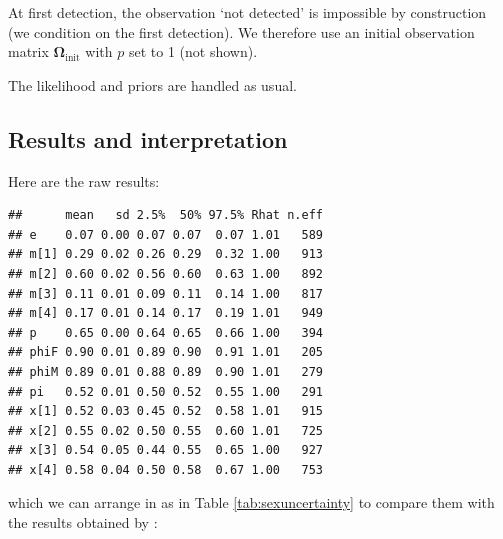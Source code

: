 \documentclass[
  12pt,
]{krantz}
\begin{document}
At first detection, the observation `not detected' is impossible by construction (we condition on the first detection). We therefore use an initial observation matrix \(\mathbf{\Omega}_{\text{init}}\) with \(p\) set to 1 (not shown).

The likelihood and priors are handled as usual.

\subsection{Results and interpretation}\label{results-and-interpretation-2}

Here are the raw results:

\begin{verbatim}
##      mean   sd 2.5%  50% 97.5% Rhat n.eff
## e    0.07 0.00 0.07 0.07  0.07 1.01   589
## m[1] 0.29 0.02 0.26 0.29  0.32 1.00   913
## m[2] 0.60 0.02 0.56 0.60  0.63 1.00   892
## m[3] 0.11 0.01 0.09 0.11  0.14 1.00   817
## m[4] 0.17 0.01 0.14 0.17  0.19 1.01   949
## p    0.65 0.00 0.64 0.65  0.66 1.00   394
## phiF 0.90 0.01 0.89 0.90  0.91 1.01   205
## phiM 0.89 0.01 0.88 0.89  0.90 1.01   279
## pi   0.52 0.01 0.50 0.52  0.55 1.00   291
## x[1] 0.52 0.03 0.45 0.52  0.58 1.01   915
## x[2] 0.55 0.02 0.50 0.55  0.60 1.01   725
## x[3] 0.54 0.05 0.44 0.55  0.65 1.00   927
## x[4] 0.58 0.04 0.50 0.58  0.67 1.00   753
\end{verbatim}

which we can arrange in as in Table \ref{tab:sexuncertainty} to compare them with the results obtained by \citet{pradel2008sex}:
\end{document}
